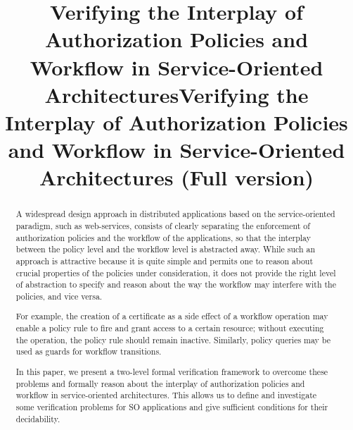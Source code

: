 \documentclass[conference]{IEEEtran}
\begin{document}
\begin{SHORT}
\title{Verifying the Interplay of Authorization Policies and Workflow in Service-Oriented Architectures}
\end{SHORT}

\begin{LONG}
\title{Verifying the Interplay of Authorization Policies and Workflow in Service-Oriented Architectures (Full version)}
\end{LONG}

\author{
}


\maketitle

\begin{abstract}
  A widespread design approach in distributed applications based on
  the service-oriented paradigm, such as web-services, consists of
  clearly separating the enforcement of authorization policies and the
  workflow of the applications, so that the interplay between the
  policy level and the workflow level is abstracted away.  While such
  an approach is attractive because it is quite simple and permits one
  to reason about crucial properties of the policies under
  consideration, it does not provide the right level of abstraction to
  specify and reason about the way the workflow may interfere with the
  policies, and vice versa.
  \begin{LONG}
    For example, the creation of a certificate as a side effect of a
    workflow operation may enable a policy rule to fire and grant
    access to a certain resource; without executing the operation, the
    policy rule should remain inactive.  Similarly, policy queries may
    be used as guards for workflow transitions.
  \end{LONG}

  In this paper, we present a two-level formal verification framework
  to overcome these problems 
  and formally reason about the interplay of authorization policies and
  workflow in service-oriented architectures.  This allows us to
  define and investigate some verification problems for SO
  applications and give sufficient conditions for their decidability.
\end{abstract}
\end{document}
